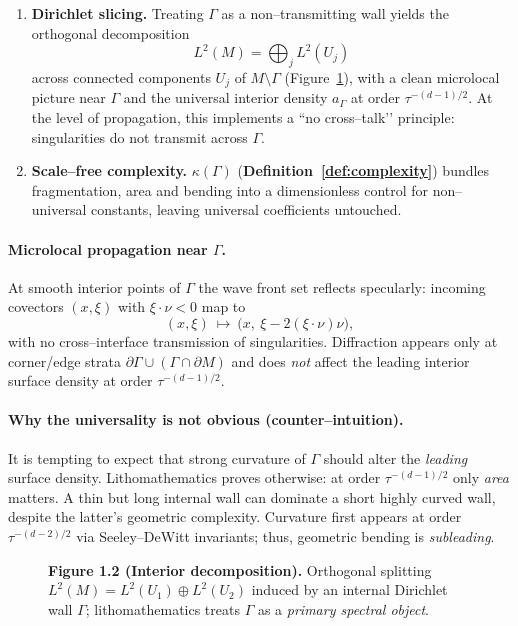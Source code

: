 \begin{enumerate}
  \item \textbf{Dirichlet slicing.} Treating $\Gamma$ as a non–transmitting wall yields the orthogonal decomposition
  \[
  L^2(M)=\bigoplus_{j} L^2(U_j)
  \]
  across connected components $U_j$ of $M\setminus\Gamma$ (Figure~\ref{fig:decomp}), with a clean microlocal picture near $\Gamma$ and the universal interior density $a_\Gamma$ at order $\tau^{-(d-1)/2}$.
  At the level of propagation, this implements a “no cross–talk’’ principle: singularities do not transmit across $\Gamma$.
  \item \textbf{Scale–free complexity.} $\kappa(\Gamma)$ (\textbf{Definition~\ref{def:complexity}}) bundles fragmentation, area and bending into a dimensionless control for non–universal constants, leaving universal coefficients untouched.
\end{enumerate}

\paragraph{Microlocal propagation near \texorpdfstring{$\Gamma$}{Gamma}.}
At smooth interior points of $\Gamma$ the wave front set reflects specularly: incoming covectors $(x,\xi)$ with $\xi\cdot\nu<0$ map to
\[
(x,\xi)\ \longmapsto\ \big(x,\ \xi-2(\xi\cdot\nu)\nu\big),
\]
with no cross–interface transmission of singularities. Diffraction appears only at corner/edge strata
$\partial\Gamma\cup(\Gamma\cap\partial M)$ and does \emph{not} affect the leading interior surface density at order $\tau^{-(d-1)/2}$.

\paragraph{Why the universality is not obvious (counter–intuition).}
It is tempting to expect that strong curvature of $\Gamma$ should alter the \emph{leading} surface density. Lithomathematics proves otherwise: at order $\tau^{-(d-1)/2}$ only \emph{area} matters. A thin but long internal wall can dominate a short highly curved wall, despite the latter’s geometric complexity. Curvature first appears at order $\tau^{-(d-2)/2}$ via Seeley–DeWitt invariants; thus, geometric bending is \emph{subleading}.

\begin{figure}[t]
\centering
{}
\caption{\textbf{Figure 1.2 (Interior decomposition).} Orthogonal splitting $L^2(M)=L^2(U_1)\oplus L^2(U_2)$ induced by an internal Dirichlet wall $\Gamma$; lithomathematics treats $\Gamma$ as a \emph{primary spectral object}.}
\label{fig:decomp}
\end{figure}


